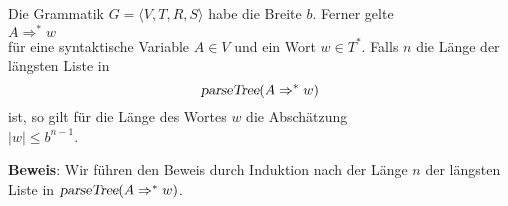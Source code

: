\begin{Lemma} \label{lemma:length}
  Die Grammatik $G = \langle V, T, R, S \rangle$ habe die Breite $b$.  Ferner gelte
  \\[0.2cm]
  \hspace*{1.3cm}
  $A \Rightarrow^* w$
  \\[0.2cm]
  f\"ur eine syntaktische Variable $A \in V$ und ein Wort $w \in T^*$.  Falls $n$ die L\"ange der l\"angsten Liste in
  \[ \textsl{parseTree}(A \Rightarrow^* w) \]
  ist, so gilt f\"ur die L\"ange des Wortes $w$ die Absch\"atzung
  \\[0.2cm]
  \hspace*{1.3cm}
  $|w| \leq b^{n-1}$.  
\end{Lemma}

\noindent
\textbf{Beweis}: Wir f\"uhren den Beweis durch Induktion nach der L\"ange $n$ der l\"angsten
Liste in $\textsl{parseTree}(A \Rightarrow^* w)$.
